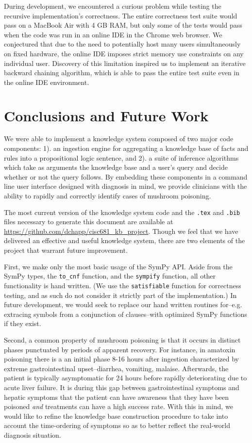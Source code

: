 \documentclass[12pt, conference, compsocconf]{IEEEtran}
\begin{document}
During development, we encountered a curious problem while testing the recursive implementation's correctness.
The entire correctness test suite would pass on a MacBook Air with 4 GB RAM, but only some of the tests would pass when the code was run in an online IDE in the Chrome web browser.
We conjectured that due to the need to potentially host many users simultaneously on fixed hardware, the online IDE imposes strict memory use constraints on any individual user. 
Discovery of this limitation inspired us to implement an iterative backward chaining algorithm, which is able to pass the entire test suite even in the online IDE environment. 


\section{Conclusions and Future Work}
We were able to implement a knowledge system composed of two major code components: 1). an ingestion engine for aggregating a knowledge base of facts and rules into a propositional logic sentence, and 2). a suite of inference algorithms which take as arguments the knowledge base and a user's query and decide whether or not the query follows. 
By embedding these components in a command line user interface designed with diagnosis in mind, we provide clinicians with the ability to rapidly and correctly identify cases of mushroom poisoning. 

The most current version of the knowledge system code and the \texttt{.tex} and \texttt{.bib} files necessary to generate this document are available at \url{https://github.com/dchapp/cisc681_kb_project}. 
Though we feel that we have delivered an effective and useful knowledge system, there are two elements of the project that warrant future improvement. 

First, we make only the most basic usage of the SymPy API. 
Aside from the SymPy types, the \texttt{to\_cnf} function, and the \texttt{sympify} function, all other functionality is hand written. 
(We use the \texttt{satisfiable} function for correctness testing, and as such do not consider it strictly part of the implementation.) 
In future development, we would seek to replace our hand written routines for--e.g. extracing symbols from a conjunction of clauses--with optimized SymPy functions if they exist. 

Second, a common property of mushroom poisoning is that it occurs in distinct phases punctuated by periods of apparent recovery. 
For instance, in amatoxin poisoning there is a an initial phase 8-16 hours after ingestion characterized by extreme gastrointestinal upset--diarrhea, vomiting, malaise.
Afterwards, the patient is typically asymptomatic for 24 hours before rapidly deteriorating due to acute liver failure. 
It is during this gap between gastrointestinal symptoms and hepatic symptoms that the patient can have awareness that they have been poisoned \emph{and} treatments can have a high success rate. 
With this in mind, we would like to refine the knowledge base construction procedure to take into account the time-ordering of symptoms so as to better reflect the real-world diagnosis situation. 




\end{document}
